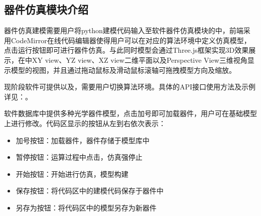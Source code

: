 \documentclass[letterpaper,10pt,english]{sphinxmanual}
\begin{document}
{{\subsection{器件仿真模块介绍}
\label{\detokenize{_u8f6f_u4ef6_u6a21_u5757_u4ecb_u7ecd/_u5668_u4ef6_u4eff_u771f/contents:id2}}
\sphinxAtStartPar
器件仿真建模需要用户将python建模代码输入至软件器件仿真模块的中，前端采用CodeMirror在线代码编辑器使得用户可以在对应的算法环境中定义仿真模型，点击运行按钮即可进行器件仿真。与此同时模型会通过Three.js框架实现3D效果展示，在中XY view、YZ view、XZ view二维平面以及Perspective View三维视角显示模型的视图，并且通过拖动鼠标及滑动鼠标滚轴可拖拽模型方向及缩放。


\sphinxAtStartPar
{}





\sphinxAtStartPar
现阶段软件可提供以及，需要用户切换算法环境。具体的API接口使用方法及示例详见：。

\sphinxAtStartPar
软件数据库中提供多种光学器件模型，点击加号即可加载器件，用户可在基础模型上进行修改。代码区显示的按钮从左到右依次表示：
\begin{itemize}
\item {} 
\sphinxAtStartPar
加号按钮：加载器件，器件存储于模型库中

\item {} 
\sphinxAtStartPar
暂停按钮：运算过程中点击，仿真强停止

\item {} 
\sphinxAtStartPar
开始按钮：开始进行仿真，模型构建

\item {} 
\sphinxAtStartPar
保存按钮：将代码区中的建模代码保存于器件中

\item {} 
\sphinxAtStartPar
另存为按钮：将代码区中的模型另存为新器件

\end{itemize}

}}
\end{document}
